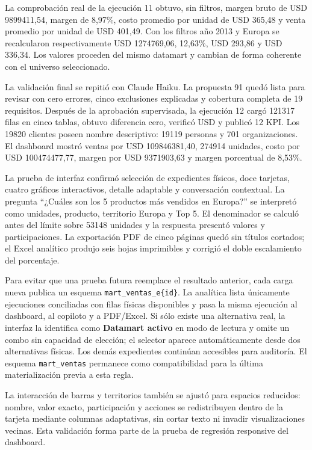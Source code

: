 \documentclass[11pt,letterpaper]{article}
\newcommand{\file}[1]{\texttt{#1}}
\begin{document}
La comprobación real de la ejecución 11 obtuvo, sin filtros, margen bruto de USD 9899411,54, margen de 8,97\%, costo promedio por unidad de USD 365,48 y venta promedio por unidad de USD 401,49. Con los filtros año 2013 y Europa se recalcularon respectivamente USD 1274769,06, 12,63\%, USD 293,86 y USD 336,34. Los valores proceden del mismo datamart y cambian de forma coherente con el universo seleccionado.

La validación final se repitió con Claude Haiku. La propuesta 91 quedó lista para revisar con cero errores, cinco exclusiones explicadas y cobertura completa de 19 requisitos. Después de la aprobación supervisada, la ejecución 12 cargó 121317 filas en cinco tablas, obtuvo diferencia cero, verificó USD y publicó 12 KPI. Los 19820 clientes poseen nombre descriptivo: 19119 personas y 701 organizaciones. El dashboard mostró ventas por USD 109846381,40, 274914 unidades, costo por USD 100474477,77, margen por USD 9371903,63 y margen porcentual de 8,53\%.

La prueba de interfaz confirmó selección de expedientes físicos, doce tarjetas, cuatro gráficos interactivos, detalle adaptable y conversación contextual. La pregunta ``¿Cuáles son los 5 productos más vendidos en Europa?'' se interpretó como unidades, producto, territorio Europa y Top 5. El denominador se calculó antes del límite sobre 53148 unidades y la respuesta presentó valores y participaciones. La exportación PDF de cinco páginas quedó sin títulos cortados; el Excel analítico produjo seis hojas imprimibles y corrigió el doble escalamiento del porcentaje.

Para evitar que una prueba futura reemplace el resultado anterior, cada carga nueva publica un esquema \file{mart\_ventas\_e\{id\}}. La analítica lista únicamente ejecuciones conciliadas con filas físicas disponibles y pasa la misma ejecución al dashboard, al copiloto y a PDF/Excel. Si sólo existe una alternativa real, la interfaz la identifica como \textbf{Datamart activo} en modo de lectura y omite un combo sin capacidad de elección; el selector aparece automáticamente desde dos alternativas físicas. Los demás expedientes continúan accesibles para auditoría. El esquema \file{mart\_ventas} permanece como compatibilidad para la última materialización previa a esta regla.

La interacción de barras y territorios también se ajustó para espacios reducidos: nombre, valor exacto, participación y acciones se redistribuyen dentro de la tarjeta mediante columnas adaptativas, sin cortar texto ni invadir visualizaciones vecinas. Esta validación forma parte de la prueba de regresión responsive del dashboard.
\end{document}
